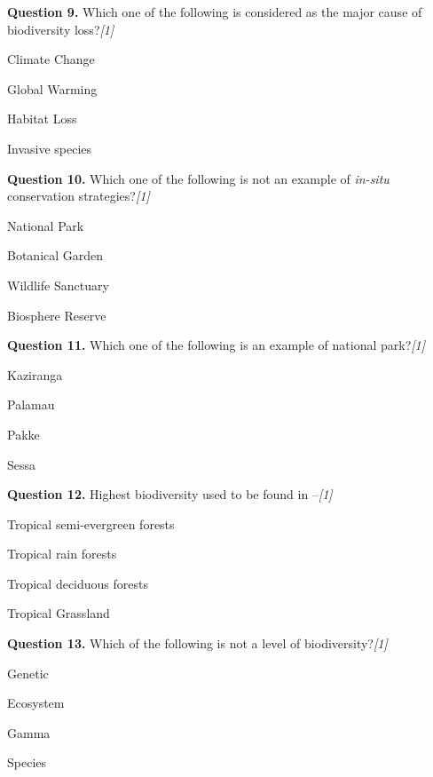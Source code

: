 \documentclass[11pt,a4paper]{article}
\newcommand{\pts}[1]{\hfill \textit{[#1]}}
\begin{document}
\medskip

\noindent \textbf{Question 9.} Which one of the following is considered as the major cause of biodiversity loss?\pts{1}
\begin{parts}
  \item Climate Change
  \item Global Warming
  \item Habitat Loss
  \item Invasive species
\end{parts}

\medskip

\noindent \textbf{Question 10.} Which one of the following is not an example of \textit{in-situ} conservation strategies?\pts{1}
\begin{parts}
  \item National Park
  \item Botanical Garden
  \item Wildlife Sanctuary
  \item Biosphere Reserve
\end{parts}

\medskip

\noindent \textbf{Question 11.} Which one of the following is an example of national park?\pts{1}
\begin{parts}
  \item Kaziranga
  \item Palamau
  \item Pakke
  \item Sessa
\end{parts}

\medskip

\noindent \textbf{Question 12.} Highest biodiversity used to be found in --\pts{1}
\begin{parts}
  \item Tropical semi-evergreen forests
  \item Tropical rain forests
  \item Tropical deciduous forests
  \item Tropical Grassland
\end{parts}

\medskip

\noindent \textbf{Question 13.} Which of the following is not a level of biodiversity?\pts{1}
\begin{parts}
  \item Genetic
  \item Ecosystem
  \item Gamma
  \item Species
\end{parts}
\end{document}
